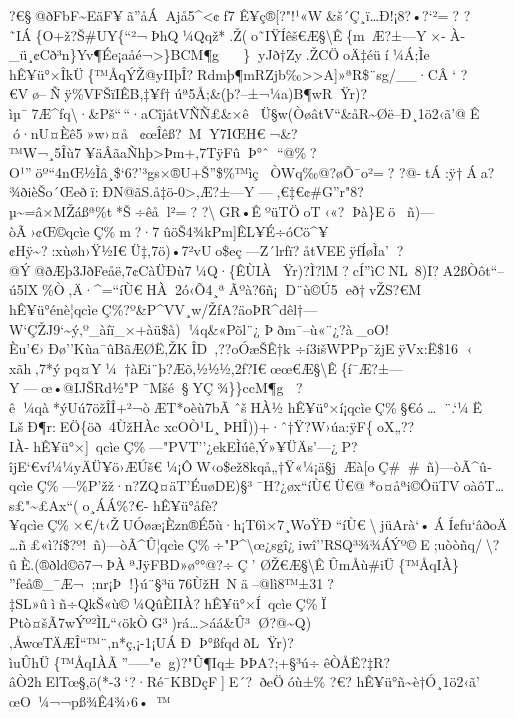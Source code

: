 ?€§@ðFbF\textasciitilde EäF¥ã''åÁAjå5\^{}\textless¢ƒ7
Ê¥ç®{[}?"!¹«W\textquotesingle\&š´Ç¸ï\ldots Ð!¡8?•?{}`²=? 
? 
˜I Á\{O+ž?Š\#UY\{``²¬ÞhQ¼Qqž*.Ž(o˜IŸÍêš€Æ§\textbackslash Ê\{m~Æ?±---Y×-À­\_\textbar ü¸¢Cð³n\}Yv¶Ée¡\textbar aåé¬\textgreater\}\textbar BCM¶g
\}yJð†Zy.ŽCÖoÄ‡éüí¼Á;Ìe
h\textbar Ê¥ü°×ÎkÜ\{™ÅqÝŽ@yIIþÎ?Rdmþ¶mRZjb‰\textgreater\textgreater A{]}»ªR\$¨sg/\_\_·CÂ` 
?€Vø--Ñÿ\%VFŠïIÊB,‡¥ƒ†úª5Å;\&(þ?--±¬¼a)B¶wRŸr)?ìµ¯7Æ\^{}fq\textbackslash·\&Pš``\,``·aCîjåtVÑÑ£\&×êÜ§w(ÒøâtV``\&åR\textasciitilde Øë--Ð¸1ö2‹ã'@­Ê
ó·nU¤Èê5»w›¤å ¢œÎêß?~MY7IŒH€¬\&?™W¬¸5Îù7¥äÂãaÑhþ\textgreater Þm+‚7TÿFûÞ°ˆ``@\%?O¹''öº``4nŒ½Ìâ¸\$`6?'³gs×®U+Š''\$\%™ìçÒWq‰@?øÕ¯o²=? 
?@-tÁ:ÿ†Áa?¾ðièŠo´Œeðï:ÐN@ãS.å‡ö-0\textgreater‚Æ?±---Y---,\textquotesingle€‡€¢\#G''r"8?µ\textasciitilde=â×MŽáßª\%t*Š÷êål²=? 
? \textbackslashGR•ÊºüTÖoT‹«?Þà\}Eö
~ñ)---òÃ›¢Œ©qcìeÇ\%m?·7ûöŠ4¾kPm{]}ÊL¥É÷óCö\^{}¥¢Hÿ\textasciitilde?:xùøh›Ÿ½I€Ü‡ ‚7ö)•7²v\textquotesingle Uo\$eç---Z´lrfï?åtVEEÿfÍøÌa'?@Ý@ðÆþ3JðFeåë‚7¢CàÜÐù7¼Q·\{ÊÙIÀŸr)?Ì?lM?cÍ''ìCNL~8)I?A2ßÒôt``--ú5lX\%Ò‚Ä·\^{}=``íÙ€HÀ2ó‹Õ4¸ªÃºà?6ñ¡D¨ù©Ú5eð†vŽS?€M
h\textbar Ê¥ü°énè¦qcìeÇ\%?º\&P\^{}VV¸w/ŽfA?äoÞR\^{}dêl†---W`ÇŽJ9`\textasciitilde ý‚º\_àíï\_×+àü\$à)¼q\&«Põl¨¿­
Þðm¯--ù«¨¿?à\_oO!Èu'€›Ðø''Kùa¯ûBãÆØË,ŽKÎD~,??oÓæŠÊ†k
÷í3išWPPp¯žjEÿV­x:Ë\$16 ‹
xãh‚7*ýpq¤Y¼†àEi¨þ?Æõ‚½½½,2ƒ?I€œœ€Æ§\textbackslash Ê\{í¯Æ?±---Y---œ•@IJŠRd½"P¯Mšé§YÇ­¾\}\}ccM¶g
?ê¼qà*ýUú7öžÎÎ+²¬òÆT*oèù7bÃˆšHÀ½
h\textbar Ê¥ü°×í¡qcìeÇ\%§\textquotesingle€ó\ldots¨.`¼Ë
LšÐ¶­r:EÖ\{öð4ÙžHÀc
xcOÒ¹L¸ÞHÎ))+·ˆ†Ÿ?W›úa:ÿF\{oX„??IÀ-h\textbar Ê¥ü°×{]}~qcìeÇ\%---"PVT''¿ekEÌúê‚Ý»¥ÜÄs'---¿P?îjE`€ví¼¼yÄÜ¥ö›ÆÚš€¼¡ÔW‹o\$ež8kqå„†Ÿ«¼¡ä§jÆà{[}oÇ\#\#~ñ)---òÃ\^{}û­qcìeÇ\%---\%P'žž·n?ZQ¤äT'ÉuøDE)§³¯H?¿øx``íÙ€Ü€@*o¤åªi©ÔüTVoàôT\ldots s£"\textasciitilde£Ax``(o¸Á­Á\%?€-
h\textbar Ê¥ü°åfè?¥qcìeÇ\%×\textquotesingle€/t‹ŽUÓøæ¡Èzn®É5ù·h¡T6ì×7¸WoŸÐ``íÙ€\textbackslash{}jüArà`•ÁÍ¢ƒu`âðoÄ\ldots ñ£«ì?í\$?º!~ñ)---òÃ\^{}Û¦qcìeÇ\%÷"P\^{}\textbackslash œ¿sgî¿i\textbar wî''RSQ³¾¾ÁÝº©E;uòòñq/\textbackslash?ûÈ.(®ðld©õ7¬ÞÀªJÿFBD»ø°°@?÷Ç' 
ØŽ€Æ§\textbackslash ÊÛmÅù\#iÜ\{™ÅqIÀ\}
''feå®\_¯Æ¬;nr¡Þ!\}ú¨§³ü76ÙžH~Nä--@lì8™±31?‡SL»ûìñ÷QkŠ«ù©¼Q\textquotesingle ûÈIIÀ?h\textbar Ê¥ü°×Í~qcìeÇ\%Ï
Ptò¤šÃ7wÝº²ÌL``‹ökÒG³)rá\ldots\textgreater áá\&Û³
Ø?@\textasciitilde Q)‚ÅwœTÄÆÎ``™¨,n*ç‚¡-1¡UÁÐÞ°ßfqdðLŸr)?ìuÛhÜ\{™ÅqIÀÃ''-----"eg)?"Û¶Iq±
 ÞÞA?;+§³ú÷êÒÅË?‡R?âÒ2hElTœ§‚ö(*-3`?·Ré¯KBDçF{]}E´?ðeÖóù±\% ?€?
h\textbar Ê¥ü°ñ\textasciitilde è†Ó¸1ö2‹ã'  œO~¼¬¬pß¾Ê4¾›6•™
